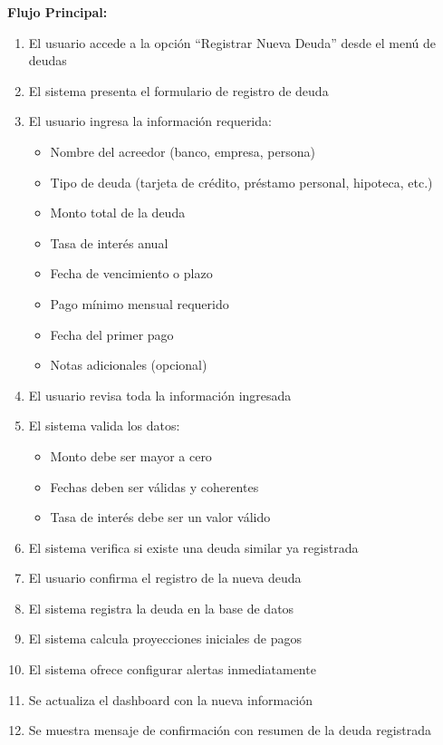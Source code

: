 \noindent\textbf{Flujo Principal:}
\begin{enumerate}
    \item El usuario accede a la opción ``Registrar Nueva Deuda'' desde el menú de deudas
    \item El sistema presenta el formulario de registro de deuda
    \item El usuario ingresa la información requerida:
    \begin{itemize}
        \item Nombre del acreedor (banco, empresa, persona)
        \item Tipo de deuda (tarjeta de crédito, préstamo personal, hipoteca, etc.)
        \item Monto total de la deuda
        \item Tasa de interés anual
        \item Fecha de vencimiento o plazo
        \item Pago mínimo mensual requerido
        \item Fecha del primer pago
        \item Notas adicionales (opcional)
    \end{itemize}
    \item El usuario revisa toda la información ingresada
    \item El sistema valida los datos:
    \begin{itemize}
        \item Monto debe ser mayor a cero
        \item Fechas deben ser válidas y coherentes
        \item Tasa de interés debe ser un valor válido
    \end{itemize}
    \item El sistema verifica si existe una deuda similar ya registrada
    \item El usuario confirma el registro de la nueva deuda
    \item El sistema registra la deuda en la base de datos
    \item El sistema calcula proyecciones iniciales de pagos
    \item El sistema ofrece configurar alertas inmediatamente
    \item Se actualiza el dashboard con la nueva información
    \item Se muestra mensaje de confirmación con resumen de la deuda registrada
\end{enumerate}

